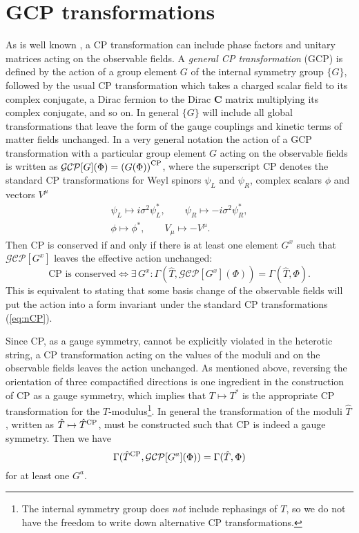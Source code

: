 \documentclass[a4paper,12pt]{article}
\begin{document}
\section{GCP transformations} 
As is well known \cite{BernabeuBG,BotellaS}, a CP transformation can include phase factors and unitary matrices acting on the observable fields. A {\em general CP transformation}\/ (GCP) is defined by the action of a group element $G$ of the internal symmetry group $\{G\}$, followed by the usual CP transformation which takes a charged scalar field to its complex conjugate, a Dirac fermion to the Dirac $\mathbf{C}$ matrix multiplying its complex conjugate, and so on. In general $\{G\}$ will include all global transformations that leave the form of the gauge couplings and kinetic terms of matter fields unchanged. In a very general notation the action of a GCP transformation with a particular group element $G$ acting on the observable fields is written as $\mathcal{GCP}[G](\Phi) = \left(G(\Phi)\right)^{\rm CP}$, where the superscript CP denotes the standard CP transformations for Weyl spinors $\psi_L$ and $\psi_R$, complex scalars $\phi$ and vectors $V^\mu$
\begin{eqnarray} &\psi_L \mapsto i\sigma^2\psi_L^*,\qquad \psi_R \mapsto -i\sigma^2\psi_R^*,& \nonumber \\ &\phi \mapsto \phi^*,\qquad V_\mu\mapsto -V^\mu.& \label{eq:nCP}
\end{eqnarray}
Then CP is conserved if and only if there is at least one element $G^x$ such that $\mathcal{GCP}[G^x]$ leaves the effective action unchanged:
\begin{equation}
\mbox{CP is conserved}\Leftrightarrow\exists\,G^x: \Gamma(\hat{T},\mathcal{GCP}[G^x](\Phi)) = \Gamma(\hat{T},\Phi). \label{eq:CPcons}
\end{equation}
This is equivalent to stating that some basis change of the observable fields will put the action into a form invariant under the standard CP transformations (\ref{eq:nCP}).

Since CP, as a gauge symmetry, cannot be explicitly violated in the heterotic string, a CP transformation acting on the values of the moduli and on the observable fields leaves the action unchanged. As mentioned above, reversing the orientation of three compactified directions is one ingredient in the construction of CP as a gauge symmetry, which implies that $T \mapsto T^*$ is the appropriate CP transformation for the $T$-modulus\footnote{The internal symmetry group does {\em not}\/ include rephasings of $T$, so we do not have the freedom to write down alternative CP transformations.}. In general the transformation of the moduli $\hat{T}$, written as $\hat{T} \mapsto \hat{T}^{\rm CP}$, must be constructed such that CP is indeed a gauge symmetry. Then we have 
\begin{equation}
\Gamma(\hat{T}^{\rm CP}, \mathcal{GCP}[G^a](\Phi)) = \Gamma(\hat{T},\Phi) \label{eq:CPspont}
\end{equation}
for at least one $G^a$.
\end{document}

